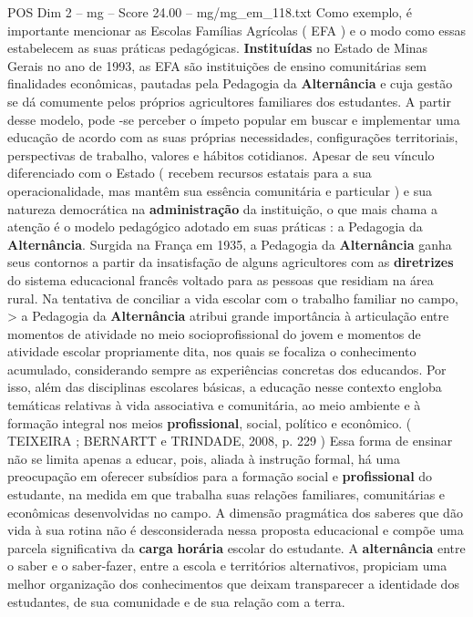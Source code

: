 \begin{textsample}{POS Dim 2 – mg – Score 24.00 – mg/mg\_em\_118.txt}
Como exemplo, é importante mencionar as Escolas Famílias Agrícolas ( EFA ) e o modo como essas estabelecem as suas práticas pedagógicas. \textbf{Instituídas} no Estado de Minas Gerais no ano de 1993, as EFA são instituições de ensino comunitárias sem finalidades econômicas, pautadas pela Pedagogia da \textbf{Alternância} e cuja gestão se dá comumente pelos próprios agricultores familiares dos estudantes.
A partir desse modelo, pode -se perceber o ímpeto popular em buscar e implementar uma educação de acordo com as suas próprias necessidades, configurações territoriais, perspectivas de trabalho, valores e hábitos cotidianos.
Apesar de seu vínculo diferenciado com o Estado ( recebem recursos estatais para a sua operacionalidade, mas mantêm sua essência comunitária e particular ) e sua natureza democrática na \textbf{administração} da instituição, o que mais chama a atenção é o modelo pedagógico adotado em suas práticas : a Pedagogia da \textbf{Alternância}.
Surgida na França em 1935, a Pedagogia da \textbf{Alternância} ganha seus contornos a partir da insatisfação de alguns agricultores com as \textbf{diretrizes} do sistema educacional francês voltado para as pessoas que residiam na área rural.
Na tentativa de conciliar a vida escolar com o trabalho familiar no campo, > a Pedagogia da \textbf{Alternância} atribui grande importância à articulação entre momentos de atividade no meio socioprofissional do jovem e momentos de atividade escolar propriamente dita, nos quais se focaliza o conhecimento acumulado, considerando sempre as experiências concretas dos educandos.
Por isso, além das disciplinas escolares básicas, a educação nesse contexto engloba temáticas relativas à vida associativa e comunitária, ao meio ambiente e à formação integral nos meios \textbf{profissional}, social, político e econômico. ( TEIXEIRA ; BERNARTT e TRINDADE, 2008, p. 229 ) Essa forma de ensinar não se limita apenas a educar, pois, aliada à instrução formal, há uma preocupação em oferecer subsídios para a formação social e \textbf{profissional} do estudante, na medida em que trabalha suas relações familiares, comunitárias e econômicas desenvolvidas no campo.
A dimensão pragmática dos saberes que dão vida à sua rotina não é desconsiderada nessa proposta educacional e compõe uma parcela significativa da \textbf{carga} \textbf{horária} escolar do estudante.
A \textbf{alternância} entre o saber e o saber-fazer, entre a escola e territórios alternativos, propiciam uma melhor organização dos conhecimentos que deixam transparecer a identidade dos estudantes, de sua comunidade e de sua relação com a terra.

\end{textsample}

